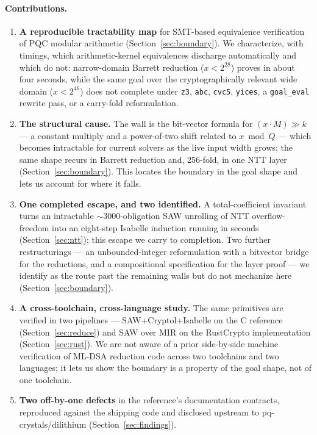 \documentclass[11pt]{article}
\newcommand{\code}[1]{\texttt{#1}}
\begin{document}
\paragraph{Contributions.}
\begin{enumerate}
  \item \textbf{A reproducible tractability map} for SMT-based equivalence verification of PQC modular
  arithmetic (Section~\ref{sec:boundary}). We characterize, with timings, which arithmetic-kernel
  equivalences discharge automatically and which do not: narrow-domain Barrett reduction ($x < 2^{28}$)
  proves in about four seconds, while the same goal over the cryptographically relevant wide domain
  ($x < 2^{46}$) does not complete under \code{z3}, \code{abc}, \code{cvc5}, \code{yices}, a
  \code{goal\_eval} rewrite pass, or a carry-fold reformulation.
  \item \textbf{The structural cause.} The wall is the bit-vector formula for $(x \cdot M) \gg k$ ---
  a constant multiply and a power-of-two shift related to $x \bmod Q$ --- which becomes intractable for
  current solvers as the live input width grows; the same shape recurs in Barrett reduction and,
  256-fold, in one NTT layer (Section~\ref{sec:boundary}). This locates the boundary in the goal shape
  and lets us account for where it falls.
  \item \textbf{One completed escape, and two identified.} A total-coefficient invariant turns an
  intractable $\sim$3000-obligation SAW unrolling of NTT overflow-freedom into an eight-step Isabelle
  induction running in seconds (Section~\ref{sec:ntt}); this escape we carry to completion. Two further
  restructurings --- an unbounded-integer reformulation with a bitvector bridge for the reductions, and
  a compositional specification for the layer proof --- we identify as the route past the remaining
  walls but do not mechanize here (Section~\ref{sec:boundary}).
  \item \textbf{A cross-toolchain, cross-language study.} The same primitives are verified in two
  pipelines --- SAW+Cryptol+Isabelle on the C reference (Section~\ref{sec:reduce}) and SAW over MIR on
  the RustCrypto implementation (Section~\ref{sec:rust}). We are not aware of a prior side-by-side
  machine verification of ML-DSA reduction code across two toolchains and two languages; it lets us show
  the boundary is a property of the goal shape, not of one toolchain.
  \item \textbf{Two off-by-one defects} in the reference's documentation contracts, reproduced against
  the shipping code and disclosed upstream to pq-crystals/dilithium (Section~\ref{sec:findings}).
\end{enumerate}
\end{document}

